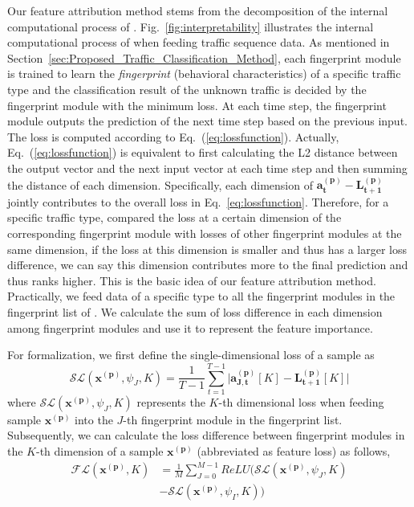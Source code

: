 Our feature attribution method stems from the decomposition of the internal computational process of \sys.
Fig.~\ref{fig:interpretability} illustrates the internal computational process of \sys when feeding traffic sequence data.
As mentioned in Section~\ref{sec:Proposed_Traffic_Classification_Method}, each fingerprint module is trained to learn the \emph{fingerprint} (behavioral characteristics) of a specific traffic type and the classification result of the unknown traffic is decided by the fingerprint module with the minimum loss. 
At each time step, the fingerprint module outputs the prediction of the next time step based on the previous input. 
The loss is computed according to Eq.~(\ref{eq:lossfunction}).
Actually, Eq.~(\ref{eq:lossfunction}) is equivalent to first calculating the L2 distance between the output vector and the next input vector at each time step and then summing the distance of each dimension.
Specifically, each dimension of $\mathbf{a_t^{(p)}} - \mathbf{L_{t+1}^{(p)}}$ jointly contributes to the overall loss in Eq.~\eqref{eq:lossfunction}.
Therefore, for a specific traffic type, compared the loss at a certain dimension of the corresponding fingerprint module with losses of other fingerprint modules at the same dimension, if the loss at this dimension is smaller and thus has a larger loss difference, we can say this dimension contributes more to the final prediction and thus ranks higher.
This is the basic idea of our feature attribution method. 
Practically, we feed data of a specific type to all the fingerprint modules in the fingerprint list of \sys. 
We calculate the sum of loss difference in each dimension among fingerprint modules and use it to represent the feature importance.

For formalization, we first define the single-dimensional loss of a sample as
\begin{equation}\label{eq:single-dimensional_loss_sample}
    \mathcal{SL}(\mathbf{x^{(p)}},  \psi_J,  K) = \frac{1}{T-1} \sum_{t=1}^{T-1}\vert \mathbf{a_{J, t}^{(p)}}[K] - \mathbf{L_{t+1}^{(p)}}[K] \vert
\end{equation}
where $\mathcal{SL}(\mathbf{x^{(p)}},  \psi_J,  K)$ represents the $K$-th dimensional loss when feeding sample $\mathbf{x^{(p)}}$ into the $J$-th fingerprint module in the fingerprint list.  
Subsequently, we can calculate the loss difference between fingerprint modules in the $K$-th dimension of a sample $\mathbf{x^{(p)}}$ (abbreviated as feature loss) as follows,
\begin{equation}\label{eq:feature_loss_sample}
\begin{split}
    \mathcal{FL}(\mathbf{x^{(p)}}, K) &= \frac{1}{M}\sum_{J=0}^{M-1} ReLU(\mathcal{SL}(\mathbf{x^{(p)}},  \psi_J,  K) \\
&- \mathcal{SL}(\mathbf{x^{(p)}},  \psi_I,  K))
\end{split}
\end{equation}

